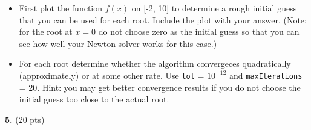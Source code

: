 \documentclass[10pt,letterpaper]{article}
\begin{document}
\begin{enumerate}
\begin{itemize}

\item First plot the function $f(x)$ on [-2, 10] to determine a rough initial guess that you can be used for each root. Include the plot with your answer. (Note: for the root at $x = 0$ do \underline{not} choose zero as the initial guess so that you can see how well your Newton solver works for this case.)

\item For each root determine whether the algorithm convergeces quadratically (approximately) or at some other rate. Use {\tt tol} = $10^{-12}$ and {\tt maxIterations} = 20. Hint: you may get better convergence results if you do not choose the initial guess too close to the actual root.

\end{itemize}

\end{enumerate}

\noindent\textbf{5.} (20 pts) 
\end{document}
